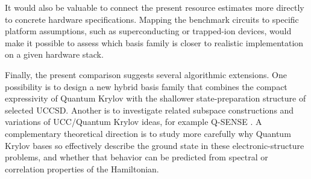 It would also be valuable to connect the present resource estimates more
directly to concrete hardware specifications. Mapping the benchmark circuits to
specific platform assumptions, such as superconducting or trapped-ion devices,
would make it possible to assess which basis family is closer to realistic
implementation on a given hardware stack.

Finally, the present comparison suggests several algorithmic extensions. One
possibility is to design a new hybrid basis family that combines the compact
expressivity of Quantum Krylov with the shallower state-preparation structure of
selected UCCSD. Another is to investigate related subspace constructions and
variations of UCC/Quantum Krylov ideas, for example Q-SENSE
\cite{patel2025qsense}. A complementary theoretical direction is to study more
carefully why Quantum Krylov bases so effectively describe the ground state in these
electronic-structure problems, and whether that behavior can be predicted from
spectral or correlation properties of the Hamiltonian.
